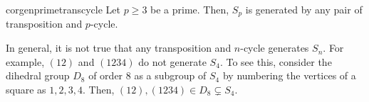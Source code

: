 \begin{restatable}[]{cor}{genprimetranscycle}
\label{cor:genprimetranscycle}
	Let $p \ge 3$ be a prime. Then, $S_p$ is generated by any pair of transposition and $p$-cycle. \hfill\hyperref[cor:genprimetranscycle2]{\downsym}
\end{restatable}

\begin{rem}
	In general, it is not true that any transposition and $n$-cycle generates $S_n.$ For example, $(12)$ and $(1234)$ do not generate $S_4.$ To see this, consider the dihedral group $D_8$ of order $8$ as a subgroup of $S_4$ by numbering the vertices of a square as $1, 2, 3, 4.$ Then, $(12), (1234) \in D_8 \subsetneq S_4.$
\end{rem}
